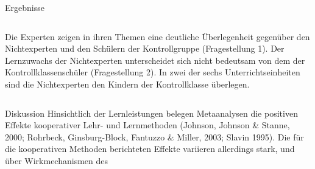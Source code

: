 \begin{block}{Ergebnisse}
\begin{columns}[t,totalwidth=\twocolwid]
\begin{column}{\onecolwid}
\justifying
Die Experten zeigen in ihren Themen eine deutliche Überlegenheit gegenüber den Nichtexperten und den Schülern der Kontrollgruppe (Fragestellung 1). 
Der Lernzuwachs der Nichtexperten unterscheidet sich nicht bedeutsam von dem der Kontrollklassenschüler (Fragestellung 2).
In zwei der sechs Unterrichtseinheiten sind die Nichtexperten den Kindern der Kontrollklasse überlegen. 

\end{column}

\end{columns}
\end{block}

\begin{block}{Diskussion}
Hinsichtlich der Lernleistungen  belegen Metaanalysen die positiven Effekte kooperativer Lehr- und Lernmethoden (Johnson, Johnson \& Stanne, 2000; Rohrbeck, Ginsburg-Block, Fantuzzo \& Miller, 2003; Slavin 1995). Die für die kooperativen Methoden berichteten Effekte variieren allerdings stark, und über Wirkmechanismen des 
\end{block}
